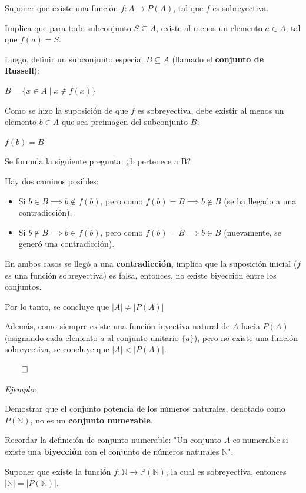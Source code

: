 \documentclass{article}
\begin{document}
Suponer que existe una función $f: A \to P(A)$, tal que $f$ es sobreyectiva.

Implica que para todo subconjunto $S \subseteq A$, existe al menos un elemento $a \in A$, tal que $f(a) = S$.

Luego, definir un subconjunto especial $B \subseteq A$ (llamado el \textbf{conjunto de Russell}):

$B = \{x \in A \mid x \notin f(x)\}$

Como se hizo la suposición de que $f$ es sobreyectiva, debe existir al menos un elemento $b \in A$ que sea preimagen del subconjunto $B$:

$f(b) = B$

Se formula la siguiente pregunta: ¿b pertenece a B?

Hay dos caminos posibles:

\begin{itemize}
    \item Si $b \in B \implies b \notin f(b)$, pero como $f(b) = B \implies b \notin B$ (se ha llegado a una contradicción).
    \item Si $b \notin B \implies b \in f(b)$, pero como $f(b) = B \implies b \in B$ (nuevamente, se generó una contradicción).
\end{itemize}

En ambos casos se llegó a una \textbf{contradicción}, implica que la suposición inicial ($f$ es una función sobreyectiva) es falsa, entonces, no existe biyección entre los conjuntos.

Por lo tanto, se concluye que $\left|A\right| \neq \left|P(A)\right|$

Además, como siempre existe una función inyectiva natural de $A$ hacia $P(A)$ (asignando cada elemento $a$ al conjunto unitario $\{a\}$), pero no existe una función sobreyectiva, se concluye que $\left|A\right| < \left|P(A)\right|$.

$\qed$

\textit{Ejemplo:}

Demostrar que el conjunto potencia de los números naturales, denotado como $P(\mathbb{N})$, no es un \textbf{conjunto numerable}.

Recordar la definición de conjunto numerable: "Un conjunto $A$ es numerable si existe una \textbf{biyección} con el conjunto de números naturales $\mathbb{N}$".

Suponer que existe la función $f: \mathbb{N} \to \mathbb{P(\mathbb{N})}$, la cual es sobreyectiva, entonces $\left|\mathbb{N}\right| = \left|P(\mathbb{N})\right|$.
\end{document}
